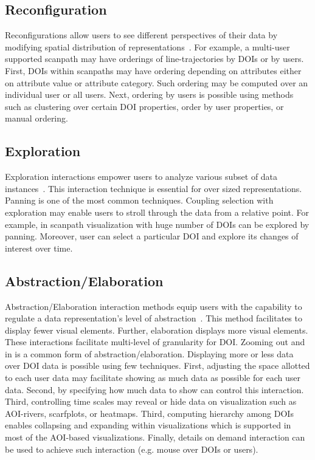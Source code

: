 	
\subsection{Reconfiguration}
 Reconfigurations allow users to see different perspectives of their data by modifying spatial distribution of representations~\cite{yi2007toward}.  For example, a multi-user supported scanpath may have orderings of line-trajectories by DOIs or by users. First, DOIs within scanpaths may have ordering depending on attributes either on attribute value or attribute category. Such ordering may be computed over an individual user or all users. Next, ordering by users is possible using methods such as clustering over certain DOI properties, order by user properties, or manual ordering.

\subsection{Exploration} 
Exploration interactions empower users to analyze various subset of data instances~\cite{yi2007toward}. This interaction technique is essential for over sized representations. Panning is one of the most common techniques. Coupling selection with exploration may enable users to stroll through the data from a relative point. For example, in scanpath visualization with huge number of DOIs can be explored by panning. Moreover, user can select a particular DOI and explore its changes of interest over time. 
	
\subsection{Abstraction/Elaboration} 
\label{sec:AbstractElaborate}
Abstraction/Elaboration interaction methods equip users with the capability to regulate a data representation's level of abstraction~\cite{yi2007toward}. This method facilitates to display fewer visual elements. Further, elaboration displays more visual elements. These interactions facilitate multi-level of granularity for DOI. Zooming out and in is a common form of abstraction/elaboration. Displaying more or less data over DOI data is possible using few techniques. First, adjusting the space allotted to each user data may facilitate showing as much data as possible for each user data. Second, by specifying how much data to show can control this interaction. Third, controlling time scales may reveal or hide data on visualization such as AOI-rivers, scarfplots, or heatmaps. Third, computing hierarchy among DOIs enables collapsing and expanding within visualizations which is supported in most of the AOI-based visualizations. Finally, details on demand interaction can be used to achieve such interaction (e.g. mouse over DOIs or users).
	
